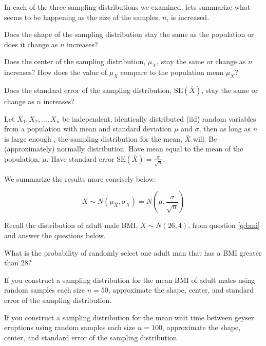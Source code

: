 \bb[resume]
\ii In each of the three sampling distributions we examined, lets summarize what seems to be happening as the size of the samples, $n$, is increased.

\bb
\ii Does the shape of the sampling distribution stay the same as the population or does it change as $n$ increases? \vfill

\ii Does the center of the sampling distribution, $\mu_{\overline{X}}$, stay the same or change as $n$ increases? How does the value of $\mu_{\overline{X}}$ compare to the population mean $\mu_X$? \vfill

\ii Does the standard error of the sampling distribution, $\mbox{SE}(\overline{X})$, stay the same or change as $n$ increases?  \vfill

\ee
\ee

\clearpage


\bbox
Let $X_1, X_2, \ldots , X_n$ be independent, identically distributed (iid) random variables from a population with mean and
standard deviation $\mu$ and $\sigma$, then as long as $n$ is large enough , the sampling distribution for the mean, $\bar{X}$ will:
\bi
\ii Be (approximately) normally distribution.
\ii Have mean equal to the mean of the population, $\mu$.
\ii Have standard error $\mbox{SE}(\bar{X}) = \frac{\sigma}{\sqrt{n}}$.
\ei

We summarize the results more concisely below:

\alert{ \[ \overline{X} \sim N \left( \mu_{\overline{X}} , \sigma_{\overline{X}} \right) = N \left( \mu  , \frac{\sigma}{\sqrt{n}} \right) \] }

\ebox

\bb[resume]
\ii Recall the distribution of adult male BMI,  $X \sim N(26,4)$, from question \ref{q:bmi} and answer the questions below.

\bb
\ii What is the probability of randomly select one adult man that has a BMI greater than 28? \vfill

\ii If you construct a sampling distribution for the mean BMI of adult males using random samples each size $n=50$, approximate the shape, center, and standard error of the sampling distribution. \vfill

\ii If you construct a sampling distribution for the mean wait time between geyser eruptions using random samples each size $n=100$, approximate the shape, center, and standard error of the sampling distribution. \vfill

